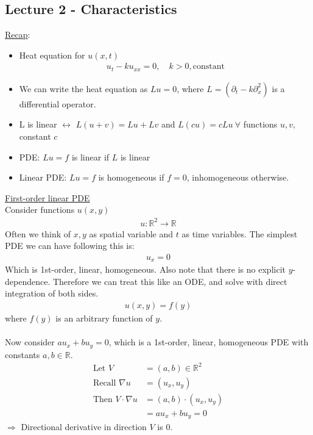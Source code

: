 \documentclass[12pt, letterpaper]{article}
\begin{document}
\subsection{Lecture 2 - Characteristics}
\underline{Recap}:
\begin{itemize}
    \item Heat equation for $u(x,t)$ 
    \begin{align*}
        u_t - ku_{xx} = 0, \quad k > 0, \text{constant}
    \end{align*}
    \item We can write the heat equation as $Lu = 0$, where $L = (\partial_t - k \partial_x^2)$ 
    is a differential operator.
    \item L is linear $\leftrightarrow$ $L(u+v) = Lu + Lv$ and $L(cu) = cLu\ \forall $ 
    functions $u,v, $ constant $c$
    \item PDE: $Lu = f$ is linear if $L$ is linear 
    \item Linear PDE: $Lu = f$ is homogeneous if $f = 0$, inhomogeneous otherwise.
\end{itemize}
\underline{First-order linear PDE} \\
Consider functions $u(x,y)$
\begin{align*}
    u:\mathbb{R}^2 \rightarrow \mathbb{R}
\end{align*}
Often we think of $x,y$ as spatial variable and $t$ as time variables. The simplest PDE we 
can have following this is:
\begin{align*}
    u_x = 0
\end{align*}
Which is 1st-order, linear, homogeneous. Also note that there is no explicit $y$-dependence. 
Therefore we can treat this like an ODE, and solve with direct integration of both sides.
\begin{align*}
    u(x,y) = f(y)
\end{align*}
where $f(y)$ is an arbitrary function of $y$. \\ \\
Now consider $au_x + bu_y = 0$, which is a 1st-order, linear, homogeneous PDE with constants 
$a,b \in \mathbb{R}$.
\begin{align*}
    \text{Let } V &= (a,b) \in \mathbb{R}^2 \\
    \text{Recall } \nabla u &= (u_x,u_y) \\
    \text{Then } V \cdot \nabla u &= (a,b) \cdot (u_x,u_y) \\
    &= au_x + bu_y = 0
\end{align*}
$\Rightarrow$ Directional derivative in direction $V$ is 0. \\
\end{document}
